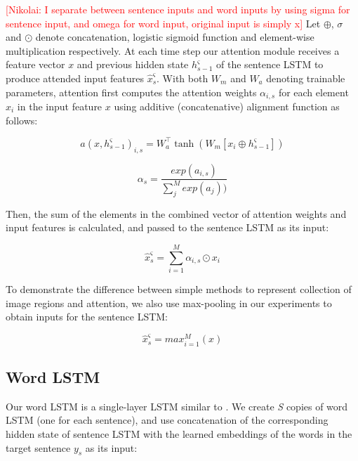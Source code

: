\documentclass[11pt,a4paper]{article}
\newcommand{\kibitz}[2]{\ifnum\Comments=1\textcolor{#1}{#2}\fi}
\newcommand{\nikolai}[1]{\kibitz{red}      {[Nikolai: #1]}}
\begin{document}
\nikolai{I separate between sentence inputs and word inputs by using sigma for sentence input, and omega for word input, original input is simply x}
Let $\oplus$, $\sigma$ and $\odot$ denote concatenation, logistic sigmoid function and element-wise multiplication respectively.
At each time step our attention module receives a feature vector $x$ and previous hidden state $h^\varsigma_{s-1}$ of the sentence LSTM to produce attended input features $\hat{x}^\varsigma_s$.
With both $W_m$ and $W_a$ denoting trainable parameters, attention first computes the attention weights $\alpha_{i,s}$ for each element $x_i$ in the input feature $x$ using additive (concatenative) alignment function as follows:

\begin{equation}
    a(x, h^\varsigma_{s-1})_{i,s} = W_a^\top \tanh (W_m[x_i \oplus h^\varsigma_{s-1}])
\end{equation}

\begin{equation}
    \alpha_s = \frac{exp(a_{i,s})}{\sum_{j}^{M}exp(a_j))}
\end{equation}

Then, the sum of the elements in the combined vector of attention weights and input features is calculated, and passed to the sentence LSTM as its input:

\begin{equation}
    \hat{x}^\varsigma_s = \sum_{i=1}^{M} \alpha_{i,s} \odot x_i
\end{equation}

To demonstrate the difference between simple methods to represent collection of image regions and attention, we also use max-pooling in our experiments to obtain inputs for the sentence LSTM:

\begin{equation}
    \hat{x}^\varsigma_s =  max_{i=1}^M(x)
\end{equation}


\subsection{Word LSTM}
Our word LSTM is a single-layer LSTM similar to .
We create \textit{S} copies of word LSTM (one for each sentence), and use concatenation of the corresponding hidden state of sentence LSTM with the learned embeddings of the words in the target sentence $y_s$ as its input: %
\end{document}
